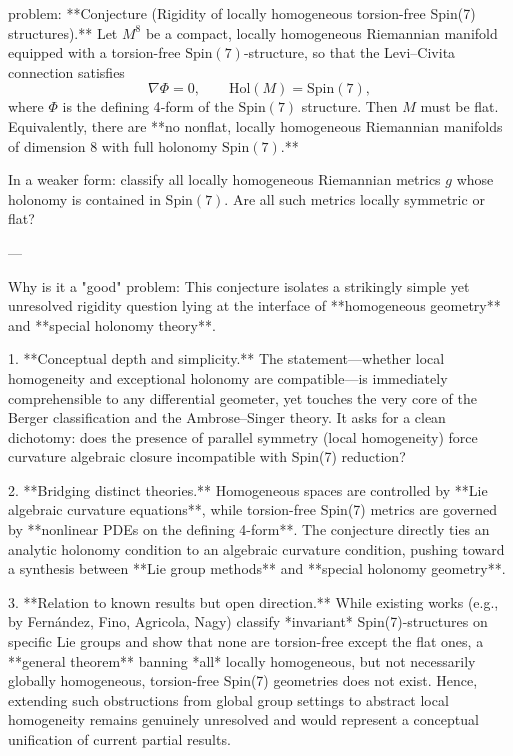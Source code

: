 problem:  
**Conjecture (Rigidity of locally homogeneous torsion-free Spin(7) structures).**  
Let \(M^8\) be a compact, locally homogeneous Riemannian manifold equipped with a torsion-free \(\mathrm{Spin}(7)\)-structure, so that the Levi–Civita connection satisfies  
\[
\nabla \Phi = 0, \qquad \mathrm{Hol}(M) = \mathrm{Spin}(7),
\]
where \(\Phi\) is the defining 4‑form of the \(\mathrm{Spin}(7)\) structure.  
Then \(M\) must be flat.  
Equivalently, there are **no nonflat, locally homogeneous Riemannian manifolds of dimension 8 with full holonomy \(\mathrm{Spin}(7)\).**

In a weaker form: classify all locally homogeneous Riemannian metrics \(g\) whose holonomy is contained in \(\mathrm{Spin}(7)\). Are all such metrics locally symmetric or flat?

---

Why is it a "good" problem:  
This conjecture isolates a strikingly simple yet unresolved rigidity question lying at the interface of **homogeneous geometry** and **special holonomy theory**.  

1. **Conceptual depth and simplicity.**  
   The statement—whether local homogeneity and exceptional holonomy are compatible—is immediately comprehensible to any differential geometer, yet touches the very core of the Berger classification and the Ambrose–Singer theory. It asks for a clean dichotomy: does the presence of parallel symmetry (local homogeneity) force curvature algebraic closure incompatible with Spin(7) reduction?

2. **Bridging distinct theories.**  
   Homogeneous spaces are controlled by **Lie algebraic curvature equations**, while torsion-free Spin(7) metrics are governed by **nonlinear PDEs on the defining 4-form**. The conjecture directly ties an analytic holonomy condition to an algebraic curvature condition, pushing toward a synthesis between **Lie group methods** and **special holonomy geometry**.

3. **Relation to known results but open direction.**  
   While existing works (e.g., by Fernández, Fino, Agricola, Nagy) classify *invariant* Spin(7)-structures on specific Lie groups and show that none are torsion-free except the flat ones, a **general theorem** banning *all* locally homogeneous, but not necessarily globally homogeneous, torsion-free Spin(7) geometries does not exist. Hence, extending such obstructions from global group settings to abstract local homogeneity remains genuinely unresolved and would represent a conceptual unification of current partial results.

